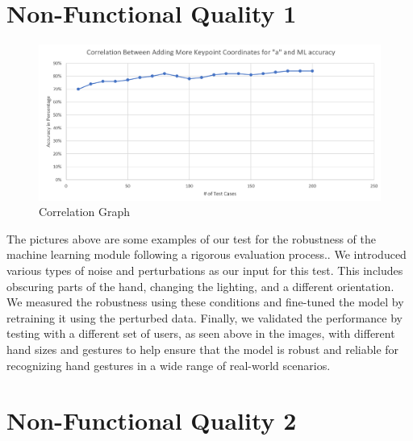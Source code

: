 \documentclass[12pt, titlepage]{article}
\begin{document}
\section{Non-Functional Quality 1}	

\begin{figure}[H] 
\centering
\includegraphics[width=\textwidth,height=0.4\textheight,keepaspectratio]{correlation.PNG} 
\caption{Correlation Graph} 
\label{Fig.Correlation} 
\end{figure}

The pictures above are some examples of our test for the robustness of the machine learning 
module following a rigorous evaluation process.. We introduced various types of noise and 
perturbations as our input for this test. This includes obscuring parts of the hand, changing
the lighting, and a different orientation. We measured the robustness using these conditions
and fine-tuned the model by retraining it using the perturbed data. Finally, we validated the
performance by testing with a different set of users, as seen above in the images, with different
hand sizes and gestures to help ensure that the model is robust and reliable for recognizing hand
gestures in a wide range of real-world scenarios.


\section{Non-Functional Quality 2}
\end{document}
